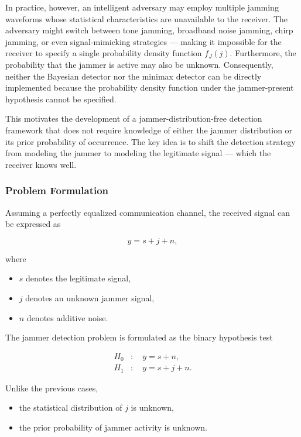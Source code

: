 \documentclass{article}
\begin{document}
In practice, however, an intelligent adversary may employ multiple jamming waveforms whose statistical characteristics are unavailable to the receiver. The adversary might switch between tone jamming, broadband noise jamming, chirp jamming, or even signal-mimicking strategies — making it impossible for the receiver to specify a single probability density function $f_{J}(j)$. Furthermore, the probability that the jammer is active may also be unknown. Consequently, neither the Bayesian detector nor the minimax detector can be directly implemented because the probability density function under the jammer-present hypothesis cannot be specified.

This motivates the development of a jammer-distribution-free detection framework that does not require knowledge of either the jammer distribution or its prior probability of occurrence. The key idea is to shift the detection strategy from modeling the jammer to modeling the legitimate signal — which the receiver knows well.

\subsubsection{Problem Formulation}

Assuming a perfectly equalized communication channel, the received signal can be expressed as

\begin{equation}
y=s+j+n,
\end{equation}

where

\begin{itemize}
\item $s$ denotes the legitimate signal,
\item $j$ denotes an unknown jammer signal,
\item $n$ denotes additive noise.
\end{itemize}

The jammer detection problem is formulated as the binary hypothesis test

\begin{align}
H_0 &: \quad y=s+n, \\
H_1 &: \quad y=s+j+n.
\end{align}

Unlike the previous cases,

\begin{itemize}
\item the statistical distribution of $j$ is unknown,
\item the prior probability of jammer activity is unknown.
\end{itemize}
\end{document}
